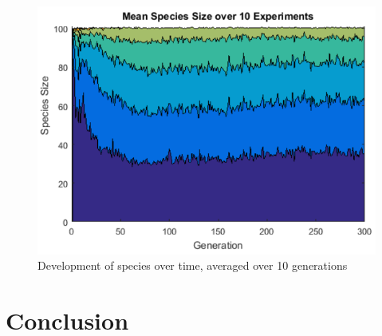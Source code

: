 \documentclass{hbrs-ecta-report}
\begin{document}
\begin{figure}[ht!]
\centering
\includegraphics[width=\linewidth]{img/6.png}
\caption{Development of species over time, averaged over 10 generations}
\label{fig:6} 
\end{figure}


\FloatBarrier
\section{Conclusion}



 
\end{document}
